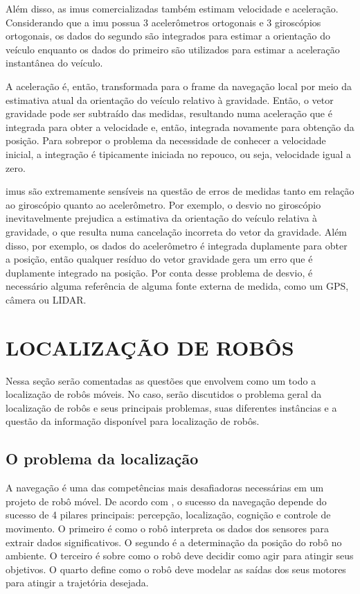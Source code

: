 \documentclass[acronym, symbols]{fei}
\begin{document}
				Além disso, as \acrshort{imu}s comercializadas também estimam velocidade e aceleração. Considerando que a \acrshort{imu} possua 3 acelerômetros ortogonais e 3 giroscópios ortogonais, os dados do segundo são integrados para estimar a orientação do veículo enquanto os dados do primeiro são utilizados para estimar a aceleração instantânea do veículo.
				
				A aceleração é, então, transformada para o frame da navegação local por meio da estimativa atual da orientação do veículo relativo à gravidade. Então, o vetor gravidade pode ser subtraído das medidas, resultando numa aceleração que é integrada para obter a velocidade e, então, integrada novamente para obtenção da posição. Para sobrepor o problema da necessidade de conhecer a velocidade inicial, a integração é tipicamente iniciada no repouco, ou seja, velocidade igual a zero.
				
				\acrshort{imu}s são extremamente sensíveis na questão de erros de medidas tanto em relação ao giroscópio quanto ao acelerômetro. Por exemplo, o desvio no giroscópio inevitavelmente prejudica a estimativa da orientação do veículo relativa à gravidade, o que resulta numa cancelação incorreta do vetor da gravidade. Além disso, por exemplo, os dados do acelerômetro é integrada duplamente para obter a posição, então qualquer resíduo do vetor gravidade gera um erro que é duplamente integrado na posição. Por conta desse problema de desvio, é necessário alguma referência de alguma fonte externa de medida, como um GPS, câmera ou LIDAR.
				
	\section{LOCALIZAÇÃO DE ROBÔS}
	
		Nessa seção serão comentadas as questões que envolvem como um todo a localização de robôs móveis. No caso, serão discutidos o problema geral da localização de robôs e seus principais problemas, suas diferentes instâncias e a questão da informação disponível para localização de robôs.
		
		\subsection{O problema da localização}
		
			A navegação é uma das competências mais desafiadoras necessárias em um projeto de robô móvel. De acordo com \textcite{siegwart2011introduction}, o sucesso da navegação depende do sucesso de 4 pilares principais: percepção, localização, cognição e controle de movimento. O primeiro é como o robô interpreta os dados dos sensores para extrair dados significativos. O segundo é a determinação da posição do robô no ambiente. O terceiro é sobre como o robô deve decidir como agir para atingir seus objetivos. O quarto define como o robô deve modelar as saídas dos seus motores para atingir a trajetória desejada.
			
\end{document}
